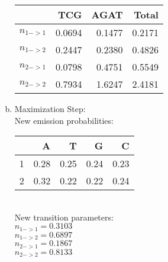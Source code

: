\documentclass[11pt]{extarticle} %
\begin{document}
\begin{enumerate}[(a)]
\begin{table}[ht]
\centering
\begin{tabular}{rrrr}
  \hline
 & TCG & AGAT & Total \\ 
  \hline
$n_{1 -> 1}$ & 0.0694 & 0.1477 & 0.2171 \\ 
$n_{1 -> 2}$ & 0.2447 & 0.2380 & 0.4826 \\ 
  \hline
  \hline
$n_{2 -> 1}$ & 0.0798 & 0.4751 & 0.5549 \\ 
$n_{2 -> 2}$ & 0.7934 & 1.6247 & 2.4181 \\ 
   \hline
\end{tabular}
\end{table}

\item Maximization Step: \\
New emission probabilities:
\begin{table}[ht]
\centering
\begin{tabular}{rrrrr}
  \hline
 & A & T & G & C \\ 
  \hline
  1 & 0.28 & 0.25 & 0.24 & 0.23 \\  %
  2 & 0.32 & 0.22 & 0.22 & 0.24 \\ 
   \hline
\end{tabular}
\end{table}
\\
New transition parameters: \\
$n_{1 -> 1} = 0.3103$ \\
$n_{1 -> 2} = 0.6897$ \\
$n_{2 -> 1} = 0.1867$ \\
$n_{2 -> 2} = 0.8133$ \\
 
\end{enumerate}
\end{document}

